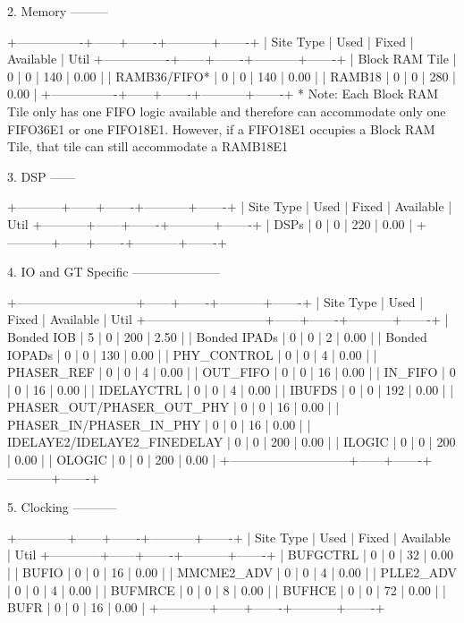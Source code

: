 \documentclass{article}
\begin{document}
2. Memory
---------

+----------------+------+-------+-----------+-------+
|    Site Type   | Used | Fixed | Available | Util%
+----------------+------+-------+-----------+-------+
| Block RAM Tile |    0 |     0 |       140 |  0.00 |
|   RAMB36/FIFO* |    0 |     0 |       140 |  0.00 |
|   RAMB18       |    0 |     0 |       280 |  0.00 |
+----------------+------+-------+-----------+-------+
* Note: Each Block RAM Tile only has one FIFO logic available and therefore can accommodate only one FIFO36E1 or one FIFO18E1. However, if a FIFO18E1 occupies a Block RAM Tile, that tile can still accommodate a RAMB18E1


3. DSP
------

+-----------+------+-------+-----------+-------+
| Site Type | Used | Fixed | Available | Util%
+-----------+------+-------+-----------+-------+
| DSPs      |    0 |     0 |       220 |  0.00 |
+-----------+------+-------+-----------+-------+


4. IO and GT Specific
---------------------

+-----------------------------+------+-------+-----------+-------+
|          Site Type          | Used | Fixed | Available | Util%
+-----------------------------+------+-------+-----------+-------+
| Bonded IOB                  |    5 |     0 |       200 |  2.50 |
| Bonded IPADs                |    0 |     0 |         2 |  0.00 |
| Bonded IOPADs               |    0 |     0 |       130 |  0.00 |
| PHY_CONTROL                 |    0 |     0 |         4 |  0.00 |
| PHASER_REF                  |    0 |     0 |         4 |  0.00 |
| OUT_FIFO                    |    0 |     0 |        16 |  0.00 |
| IN_FIFO                     |    0 |     0 |        16 |  0.00 |
| IDELAYCTRL                  |    0 |     0 |         4 |  0.00 |
| IBUFDS                      |    0 |     0 |       192 |  0.00 |
| PHASER_OUT/PHASER_OUT_PHY   |    0 |     0 |        16 |  0.00 |
| PHASER_IN/PHASER_IN_PHY     |    0 |     0 |        16 |  0.00 |
| IDELAYE2/IDELAYE2_FINEDELAY |    0 |     0 |       200 |  0.00 |
| ILOGIC                      |    0 |     0 |       200 |  0.00 |
| OLOGIC                      |    0 |     0 |       200 |  0.00 |
+-----------------------------+------+-------+-----------+-------+


5. Clocking
-----------

+------------+------+-------+-----------+-------+
|  Site Type | Used | Fixed | Available | Util%
+------------+------+-------+-----------+-------+
| BUFGCTRL   |    0 |     0 |        32 |  0.00 |
| BUFIO      |    0 |     0 |        16 |  0.00 |
| MMCME2_ADV |    0 |     0 |         4 |  0.00 |
| PLLE2_ADV  |    0 |     0 |         4 |  0.00 |
| BUFMRCE    |    0 |     0 |         8 |  0.00 |
| BUFHCE     |    0 |     0 |        72 |  0.00 |
| BUFR       |    0 |     0 |        16 |  0.00 |
+------------+------+-------+-----------+-------+
\end{document}

